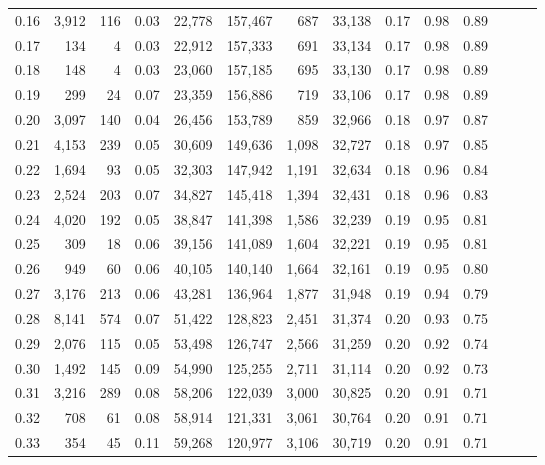 \begin{tabular}{rrrrrrrrrrrrrr}
0.16 &   3,912 &    116 &  0.03 &   22,778 &  157,467 &     687 &  33,138 &  0.17 &  0.98 &      0.89 \\
0.17 &     134 &      4 &  0.03 &   22,912 &  157,333 &     691 &  33,134 &  0.17 &  0.98 &      0.89 \\
0.18 &     148 &      4 &  0.03 &   23,060 &  157,185 &     695 &  33,130 &  0.17 &  0.98 &      0.89 \\
0.19 &     299 &     24 &  0.07 &   23,359 &  156,886 &     719 &  33,106 &  0.17 &  0.98 &      0.89 \\
0.20 &   3,097 &    140 &  0.04 &   26,456 &  153,789 &     859 &  32,966 &  0.18 &  0.97 &      0.87 \\
0.21 &   4,153 &    239 &  0.05 &   30,609 &  149,636 &   1,098 &  32,727 &  0.18 &  0.97 &      0.85 \\
0.22 &   1,694 &     93 &  0.05 &   32,303 &  147,942 &   1,191 &  32,634 &  0.18 &  0.96 &      0.84 \\
0.23 &   2,524 &    203 &  0.07 &   34,827 &  145,418 &   1,394 &  32,431 &  0.18 &  0.96 &      0.83 \\
0.24 &   4,020 &    192 &  0.05 &   38,847 &  141,398 &   1,586 &  32,239 &  0.19 &  0.95 &      0.81 \\
0.25 &     309 &     18 &  0.06 &   39,156 &  141,089 &   1,604 &  32,221 &  0.19 &  0.95 &      0.81 \\
0.26 &     949 &     60 &  0.06 &   40,105 &  140,140 &   1,664 &  32,161 &  0.19 &  0.95 &      0.80 \\
0.27 &   3,176 &    213 &  0.06 &   43,281 &  136,964 &   1,877 &  31,948 &  0.19 &  0.94 &      0.79 \\
0.28 &   8,141 &    574 &  0.07 &   51,422 &  128,823 &   2,451 &  31,374 &  0.20 &  0.93 &      0.75 \\
0.29 &   2,076 &    115 &  0.05 &   53,498 &  126,747 &   2,566 &  31,259 &  0.20 &  0.92 &      0.74 \\
0.30 &   1,492 &    145 &  0.09 &   54,990 &  125,255 &   2,711 &  31,114 &  0.20 &  0.92 &      0.73 \\
0.31 &   3,216 &    289 &  0.08 &   58,206 &  122,039 &   3,000 &  30,825 &  0.20 &  0.91 &      0.71 \\
0.32 &     708 &     61 &  0.08 &   58,914 &  121,331 &   3,061 &  30,764 &  0.20 &  0.91 &      0.71 \\
0.33 &     354 &     45 &  0.11 &   59,268 &  120,977 &   3,106 &  30,719 &  0.20 &  0.91 &      0.71 \\

\end{tabular}
